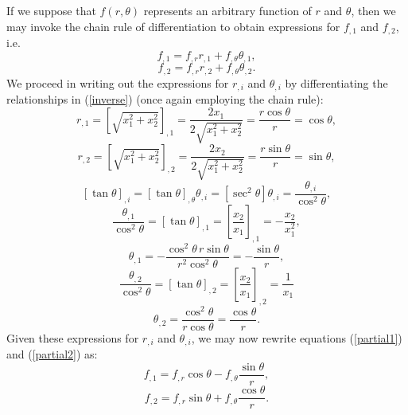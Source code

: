 \documentclass[12pt]{article}
\begin{document}
If we suppose that $f (r, \theta)$ represents an arbitrary function of $r$ and $\theta$, then we may invoke the chain rule of differentiation to obtain expressions for $f_{,1}$ and $f_{,2}$, i.e.
\begin{equation}
	f_{,1} = f_{,r} r_{,1} + f_{,\theta} \theta_{,1},
	\label{partial1}
\end{equation}
\begin{equation}
	f_{,2} = f_{,r} r_{,2} + f_{,\theta} \theta_{,2}.
	\label{partial2}
\end{equation}
We proceed in writing out the expressions for $r_{,i}$ and $\theta_{,i}$ by differentiating the relationships in (\ref{inverse}) (once again employing the chain rule):
\begin{equation}
	r_{,1} = \left[ \sqrt{x_1^2 + x_2^2} \right]_{,1} = \frac{2 x_1}{2 \sqrt{x_1^2 + x_2^2}} = \frac{r \cos \theta}{r} = \cos \theta,
\end{equation}
\begin{equation}
	r_{,2} = \left[ \sqrt{x_1^2 + x_2^2} \right]_{,2} = \frac{2 x_2}{2 \sqrt{x_1^2 + x_2^2}} = \frac{r \sin \theta}{r} = \sin \theta,
\end{equation}
\begin{equation}
	\left[ \tan \theta \right]_{,i} = \left[ \tan \theta \right]_{,\theta} \theta_{,i} = \left[\sec^2 \theta\right] \theta_{,i} = \frac{\theta_{,i}}{\cos^2 \theta},
\end{equation}
\begin{equation}
	\frac{\theta_{,1}}{\cos^2 \theta} = \left[ \tan \theta \right]_{,1} = \left[ \frac{x_2}{x_1} \right]_{,1} = - \frac{x_2}{x_1^2},
\end{equation}
\begin{equation}
	\theta_{,1} = - \frac{\cos^2 \theta \, r \sin \theta}{r^2 \cos^2 \theta} = - \frac{\sin \theta}{r},
\end{equation}
\begin{equation}
	\frac{\theta_{,2}}{\cos^2 \theta} = \left[ \tan \theta \right]_{,2} = \left[ \frac{x_2}{x_1} \right]_{,2} = \frac{1}{x_1}
\end{equation}
\begin{equation}
	\theta_{,2} = \frac{\cos^2 \theta}{r \cos \theta} = \frac{\cos \theta}{r}.
\end{equation}
Given these expressions for $r_{,i}$ and $\theta_{,i}$, we may now rewrite equations (\ref{partial1}) and (\ref{partial2}) as:
\begin{equation}
	f_{,1} = f_{,r} \cos \theta - f_{,\theta} \frac{\sin \theta}{r},
\end{equation}
\begin{equation}
	f_{,2} = f_{,r} \sin \theta + f_{,\theta} \frac{\cos \theta}{r}.
\end{equation}
\end{document}
